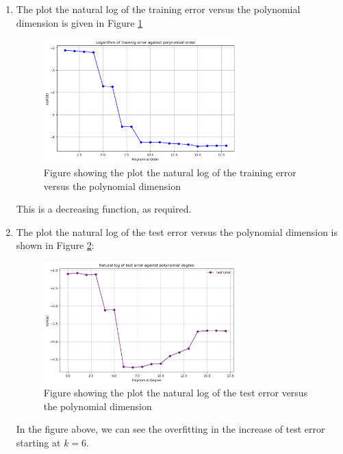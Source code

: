 \documentclass[final,3p,times,12pt]{article}
\begin{document}
\begin{enumerate}
\begin{enumerate}
        \item The plot the natural log of the training error versus the polynomial dimension is given in Figure \ref{fig:question_2b}

        \begin{figure}[H]
            \centering
            \includegraphics[width=0.7\textwidth]{images/question_2b.png}
            \caption{Figure showing the plot the natural log of the training error versus the polynomial dimension}
            \label{fig:question_2b}
        \end{figure}
        This is a decreasing function, as required. 

        \item  The plot the natural log of the test error versus the polynomial dimension is shown in Figure \ref{fig:question_2c}:

         \begin{figure}[H]
            \centering
            \includegraphics[width=0.7\textwidth]{images/question_2c.png}
            \caption{Figure showing the plot the natural log of the test error versus the polynomial dimension}
            \label{fig:question_2c}
        \end{figure}
        In the figure above, we can see the overfitting in the increase of test error starting at $k=6$.


\end{enumerate}
\end{enumerate}
\end{document}
